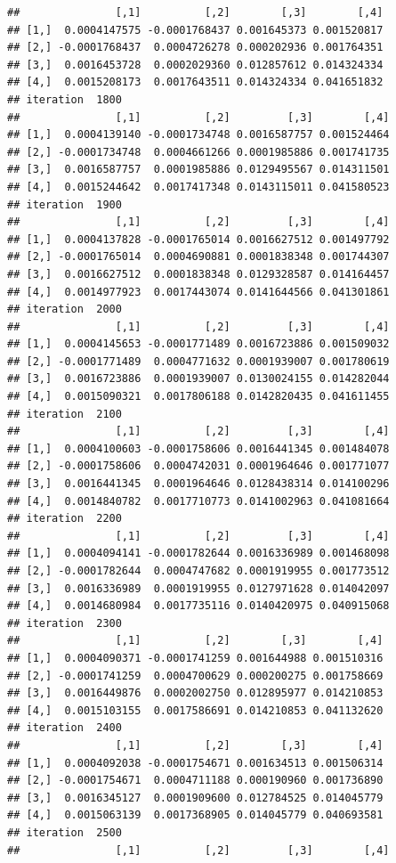 \documentclass[
]{article}
\begin{document}
\begin{verbatim}
##               [,1]          [,2]        [,3]        [,4]
## [1,]  0.0004147575 -0.0001768437 0.001645373 0.001520817
## [2,] -0.0001768437  0.0004726278 0.000202936 0.001764351
## [3,]  0.0016453728  0.0002029360 0.012857612 0.014324334
## [4,]  0.0015208173  0.0017643511 0.014324334 0.041651832
## iteration  1800 
##               [,1]          [,2]         [,3]        [,4]
## [1,]  0.0004139140 -0.0001734748 0.0016587757 0.001524464
## [2,] -0.0001734748  0.0004661266 0.0001985886 0.001741735
## [3,]  0.0016587757  0.0001985886 0.0129495567 0.014311501
## [4,]  0.0015244642  0.0017417348 0.0143115011 0.041580523
## iteration  1900 
##               [,1]          [,2]         [,3]        [,4]
## [1,]  0.0004137828 -0.0001765014 0.0016627512 0.001497792
## [2,] -0.0001765014  0.0004690881 0.0001838348 0.001744307
## [3,]  0.0016627512  0.0001838348 0.0129328587 0.014164457
## [4,]  0.0014977923  0.0017443074 0.0141644566 0.041301861
## iteration  2000 
##               [,1]          [,2]         [,3]        [,4]
## [1,]  0.0004145653 -0.0001771489 0.0016723886 0.001509032
## [2,] -0.0001771489  0.0004771632 0.0001939007 0.001780619
## [3,]  0.0016723886  0.0001939007 0.0130024155 0.014282044
## [4,]  0.0015090321  0.0017806188 0.0142820435 0.041611455
## iteration  2100 
##               [,1]          [,2]         [,3]        [,4]
## [1,]  0.0004100603 -0.0001758606 0.0016441345 0.001484078
## [2,] -0.0001758606  0.0004742031 0.0001964646 0.001771077
## [3,]  0.0016441345  0.0001964646 0.0128438314 0.014100296
## [4,]  0.0014840782  0.0017710773 0.0141002963 0.041081664
## iteration  2200 
##               [,1]          [,2]         [,3]        [,4]
## [1,]  0.0004094141 -0.0001782644 0.0016336989 0.001468098
## [2,] -0.0001782644  0.0004747682 0.0001919955 0.001773512
## [3,]  0.0016336989  0.0001919955 0.0127971628 0.014042097
## [4,]  0.0014680984  0.0017735116 0.0140420975 0.040915068
## iteration  2300 
##               [,1]          [,2]        [,3]        [,4]
## [1,]  0.0004090371 -0.0001741259 0.001644988 0.001510316
## [2,] -0.0001741259  0.0004700629 0.000200275 0.001758669
## [3,]  0.0016449876  0.0002002750 0.012895977 0.014210853
## [4,]  0.0015103155  0.0017586691 0.014210853 0.041132620
## iteration  2400 
##               [,1]          [,2]        [,3]        [,4]
## [1,]  0.0004092038 -0.0001754671 0.001634513 0.001506314
## [2,] -0.0001754671  0.0004711188 0.000190960 0.001736890
## [3,]  0.0016345127  0.0001909600 0.012784525 0.014045779
## [4,]  0.0015063139  0.0017368905 0.014045779 0.040693581
## iteration  2500 
##               [,1]          [,2]         [,3]        [,4]

\end{verbatim}
\end{document}
